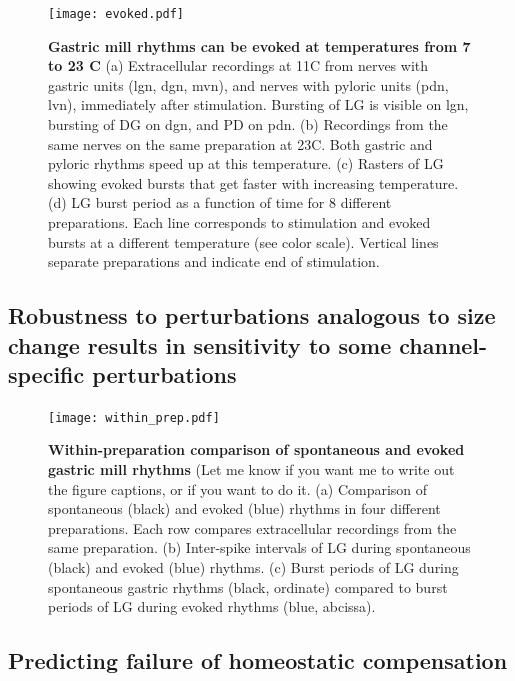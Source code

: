 \documentclass[9pt,lineno]{elife}
\begin{document}
\begin{figure}
\begin{fullwidth}
\texttt{[image: evoked.pdf]}

\caption{\textbf{Gastric mill rhythms can be evoked at temperatures from 7 to 23 C }  (a) Extracellular recordings at 11\degree C from nerves with gastric units (lgn, dgn, mvn), and nerves with pyloric units (pdn, lvn), immediately after stimulation. Bursting of LG is visible on lgn, bursting of DG on dgn, and PD on pdn. (b) Recordings from the same nerves on the same preparation at 23\degree C. Both gastric and pyloric rhythms speed up at this temperature. (c) Rasters of LG showing evoked bursts that get faster with increasing temperature. (d) LG burst period as a function of time for 8 different preparations. Each line corresponds to stimulation and evoked bursts at a different temperature (see color scale). Vertical lines separate preparations and indicate end of stimulation. } 
\label{fig:2}
\end{fullwidth}
\end{figure}




\subsection{Robustness to perturbations analogous to size change results in sensitivity to some channel-specific perturbations}


\begin{figure}
\begin{fullwidth}
\texttt{[image: within\_prep.pdf]}

\caption{\textbf{Within-preparation comparison of spontaneous and evoked gastric mill rhythms} (Let me know if you want me to write out the figure captions, or if you want to do it. (a) Comparison of spontaneous (black) and evoked (blue) rhythms in four different preparations. Each row compares extracellular recordings from the same preparation. (b) Inter-spike intervals of LG during spontaneous (black) and evoked (blue) rhythms. (c) Burst periods of LG during spontaneous gastric rhythms (black, ordinate) compared to burst periods of LG during evoked rhythms (blue, abcissa).  }
\label{fig:2}
\end{fullwidth}
\end{figure}


\lipsum[1-4]

\subsection{Predicting failure of homeostatic compensation}
\end{document}
